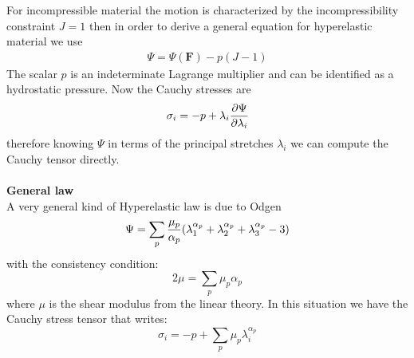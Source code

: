 \documentclass[12pt,a4paper]{article}
\numberwithin{equation}{section}
\begin{document}
\noindent
For incompressible material the motion is characterized by the incompressibility constraint $J=1$ then in order to derive a general equation for hyperelastic material we use
\begin{align} 
\Psi = \Psi(\mathbf{F}) - p(J-1)
\end{align} 
The scalar $p$ is an indeterminate Lagrange multiplier and can be identified as a hydrostatic pressure. Now the 
 Cauchy stresses are
 \begin{align} 
\sigma_i=  -p +  \lambda_i { \partial \Psi \over  \partial \lambda_i}
\end{align} 
therefore knowing $\Psi$  in terms of the principal stretches $ \lambda_i$ we can compute the Cauchy tensor directly.\\
\\
{\bf General law}\\
 A very general kind of Hyperelastic law is due to Odgen 
 \begin{equation}
 \Psi = \sum_p {\mu_p \over \alpha_p } (  \lambda^{\alpha_p}_1+ \lambda^{\alpha_p}_2+ \lambda^{\alpha_p}_3 -3 )
 \end{equation}
with the consistency condition:
\begin{equation} 
2 \mu = \sum_p \mu_p \alpha_p
\end{equation}
where $\mu$ is the shear modulus from the linear theory. In this situation we have the Cauchy stress tensor that writes:
 \begin{equation} 
\sigma_i=  -p +  \sum_p \mu_p \lambda_i^{\alpha_p}
\end{equation} 
\end{document}
